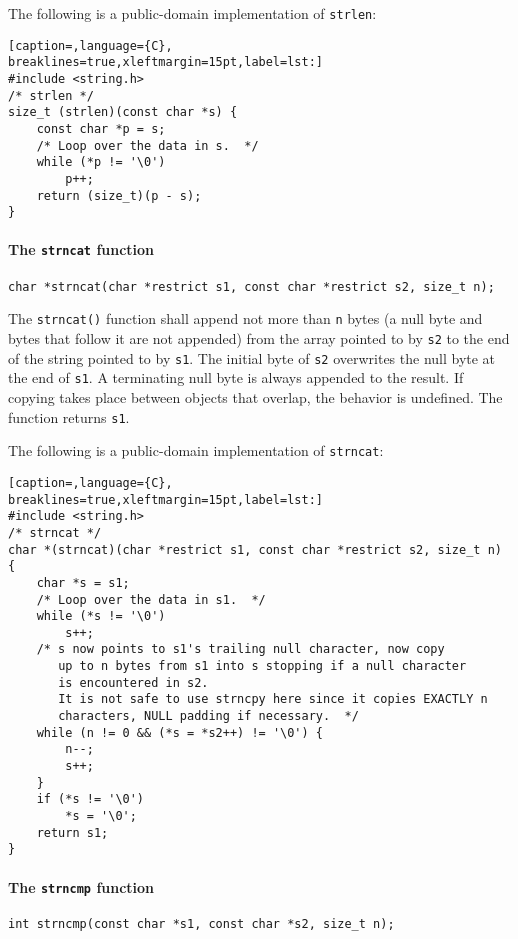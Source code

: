 The following is a public-domain implementation of \texttt{strlen}:

\lstset{basicstyle=\scriptsize, numbers=left, captionpos=b, tabsize=4}
\begin{lstlisting}[caption=,language={C},
breaklines=true,xleftmargin=15pt,label=lst:]
#include <string.h>
/* strlen */
size_t (strlen)(const char *s) {
	const char *p = s;
	/* Loop over the data in s.  */
	while (*p != '\0')
		p++;
	return (size_t)(p - s);
}
\end{lstlisting}

\paragraph{The \texttt{strncat} function}
\texttt{char *strncat(char *restrict s1, const char *restrict s2, size\_t n);}

The \texttt{strncat()} function shall append not more than \texttt{n} bytes (a
null byte and bytes that follow it are not appended) from the array pointed to
by \texttt{s2} to the end of the string pointed to by \texttt{s1}. The initial
byte of \texttt{s2} overwrites the null byte at the end of \texttt{s1}. A
terminating null byte is always appended to the result. If copying takes place
between objects that overlap, the behavior is undefined. The function returns
\texttt{s1}.

The following is a public-domain implementation of \texttt{strncat}:
\lstset{basicstyle=\scriptsize, numbers=left, captionpos=b, tabsize=4}
\begin{lstlisting}[caption=,language={C},
breaklines=true,xleftmargin=15pt,label=lst:]
#include <string.h>
/* strncat */
char *(strncat)(char *restrict s1, const char *restrict s2, size_t n) {
	char *s = s1;
	/* Loop over the data in s1.  */
	while (*s != '\0')
		s++;
	/* s now points to s1's trailing null character, now copy
	   up to n bytes from s1 into s stopping if a null character
	   is encountered in s2.
	   It is not safe to use strncpy here since it copies EXACTLY n
	   characters, NULL padding if necessary.  */
	while (n != 0 && (*s = *s2++) != '\0') {
		n--;
		s++;
	}
	if (*s != '\0')
		*s = '\0';
	return s1;
}
\end{lstlisting}

\paragraph{The \texttt{strncmp} function}
\texttt{int strncmp(const char *s1, const char *s2, size\_t n);}

